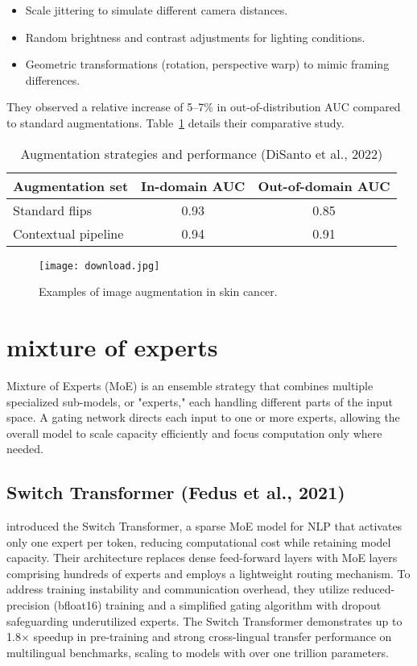 \begin{itemize}
  \item Scale jittering to simulate different camera distances.
  \item Random brightness and contrast adjustments for lighting conditions.
  \item Geometric transformations (rotation, perspective warp) to mimic framing differences.
\end{itemize}
They observed a relative increase of 5--7\% in out-of-distribution AUC compared to standard augmentations. Table~\ref{tab:disanto-results} details their comparative study.

\begin{table}[h!]
  \centering
  \caption{Augmentation strategies and performance (DiSanto et al., 2022)}
  \label{tab:disanto-results}
  \begin{tabular}{lcc}
    \hline
    Augmentation set & In-domain AUC & Out-of-domain AUC \\
    \hline
    Standard flips & 0.93 & 0.85 \\
    Contextual pipeline & 0.94 & 0.91 \\
    \hline
  \end{tabular}
\end{table}

\begin{figure}[ht]
  \centering
  \texttt{[image: download.jpg]}
  \caption{Examples of image augmentation in skin cancer.}
  \label{fig:disanto-aug}
\end{figure}

\section{mixture of experts}
Mixture of Experts (MoE) is an ensemble strategy that combines multiple specialized sub-models, or "experts," each handling different parts of the input space. A gating network directs each input to one or more experts, allowing the overall model to scale capacity efficiently and focus computation only where needed.

\subsection{Switch Transformer (Fedus et al., 2021)}
\textcite{fedus2021switch} introduced the Switch Transformer, a sparse MoE model for NLP that activates only one expert per token, reducing computational cost while retaining model capacity. Their architecture replaces dense feed-forward layers with MoE layers comprising hundreds of experts and employs a lightweight routing mechanism. To address training instability and communication overhead, they utilize reduced-precision (bfloat16) training and a simplified gating algorithm with dropout safeguarding underutilized experts. The Switch Transformer demonstrates up to 1.8$\times$ speedup in pre-training and strong cross-lingual transfer performance on multilingual benchmarks, scaling to models with over one trillion parameters.


